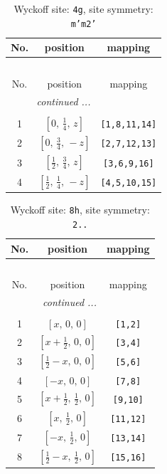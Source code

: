 \documentclass[fleqn,8pt]{jsarticle}
\begin{document}
\renewcommand{\arraystretch}{1.2}
\begin{longtable}{ccc}
\caption{Wyckoff site: {\tt 4g}, site symmetry: {\tt m'm2'}}
 \\
 \hline \hline
No. & position & mapping \\ \hline \endfirsthead

\multicolumn{2}{l}{\tablename\ \thetable{}} \\
 \hline \hline
No. & position & mapping \\ \hline \endhead

 \hline \hline
\multicolumn{2}{r}{\footnotesize\it continued ...} \\ \endfoot

 \hline \hline
\multicolumn{2}{r}{} \\ \endlastfoot

1 & $\left[ 0,\, \frac{1}{4},\, z \right]$ & {\tt [1,8,11,14]} \\ \hline
2 & $\left[ 0,\, \frac{3}{4},\, - z \right]$ & {\tt [2,7,12,13]} \\ \hline
3 & $\left[ \frac{1}{2},\, \frac{3}{4},\, z \right]$ & {\tt [3,6,9,16]} \\ \hline
4 & $\left[ \frac{1}{2},\, \frac{1}{4},\, - z \right]$ & {\tt [4,5,10,15]} \\
\end{longtable}
\renewcommand{\arraystretch}{1.2}
\begin{longtable}{ccc}
\caption{Wyckoff site: {\tt 8h}, site symmetry: {\tt 2..}}
 \\
 \hline \hline
No. & position & mapping \\ \hline \endfirsthead

\multicolumn{2}{l}{\tablename\ \thetable{}} \\
 \hline \hline
No. & position & mapping \\ \hline \endhead

 \hline \hline
\multicolumn{2}{r}{\footnotesize\it continued ...} \\ \endfoot

 \hline \hline
\multicolumn{2}{r}{} \\ \endlastfoot

1 & $\left[ x,\, 0,\, 0 \right]$ & {\tt [1,2]} \\ \hline
2 & $\left[ x + \frac{1}{2},\, 0,\, 0 \right]$ & {\tt [3,4]} \\ \hline
3 & $\left[ \frac{1}{2} - x,\, 0,\, 0 \right]$ & {\tt [5,6]} \\ \hline
4 & $\left[ - x,\, 0,\, 0 \right]$ & {\tt [7,8]} \\ \hline
5 & $\left[ x + \frac{1}{2},\, \frac{1}{2},\, 0 \right]$ & {\tt [9,10]} \\ \hline
6 & $\left[ x,\, \frac{1}{2},\, 0 \right]$ & {\tt [11,12]} \\ \hline
7 & $\left[ - x,\, \frac{1}{2},\, 0 \right]$ & {\tt [13,14]} \\ \hline
8 & $\left[ \frac{1}{2} - x,\, \frac{1}{2},\, 0 \right]$ & {\tt [15,16]} \\
\end{longtable}
\end{document}
